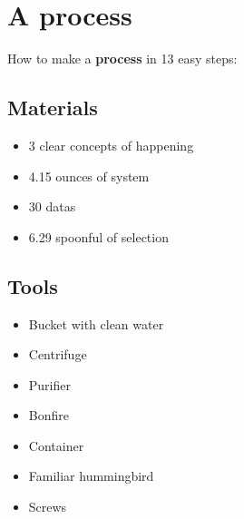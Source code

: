 \documentclass{article}
\begin{document}
\section{A process}How to make a \textbf{process} in 13 easy steps:

\subsection{Materials}\begin{itemize}
\item 
3 clear concepts of happening
\item 
4.15 ounces of system
\item 
30 datas
\item 
6.29 spoonful of selection
\end{itemize}
\subsection{Tools}\begin{itemize}
\item 
Bucket with clean water
\item 
Centrifuge
\item 
Purifier
\item 
Bonfire
\item 
Container
\item 
Familiar hummingbird
\item 
Screws
\end{itemize}
\end{document}
